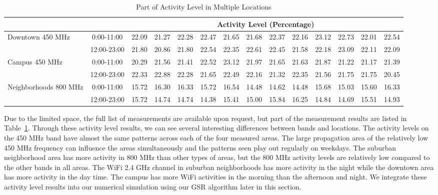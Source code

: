 \begin{table}
\begin{tabular}{|l|c|c|c|c|c|c|c|c|c|c|c|c|c|}
&& \multicolumn{12}{c|}{Activity Level (Percentage)}  \\
\hline
\multirow{2}{*}{Downtown 450 MHz}	
&0:00-11:00 &  22.09 &  21.27 &  22.28 &  22.47 &  21.65 &  21.68&  22.37 &  22.16&  23.12 &  22.73&  22.01 &  22.54 \\ 	
\cline{2-14}	
&12:00-23:00&  21.80 &  20.86 &  21.80 &  22.54 &  22.35 &  22.61&  22.45 &  21.58&  22.18 &  23.09&  22.11 &  22.09 \\ 	
\hline
\multirow{2}{*}{Campus 450 MHz}	
&0:00-11:00 &  20.29 &  21.56 &  21.41 &  22.52 &  23.12 &  21.97&  21.65 &  21.63&  21.87 &  21.22&  21.17 &  21.39 \\ 	
\cline{2-14}	
&12:00-23:00&  22.33 &  22.88 &  22.28 &  21.65 &  22.49 &  22.16&  21.32 &  22.35&  21.56 &  21.75&  21.75 &  20.45 \\ 	
\hline
\multirow{2}{*}{Neighborhoods 800 MHz}	
&0:00-11:00 &  15.72 &  16.30 &  16.33 &  15.72 &  16.54 &  14.48&  14.62 &  14.48&  15.68 &  15.03&  15.60 &  16.33 \\ 	
\cline{2-14}	
&12:00-23:00&  15.72 &  14.74 &  14.74 &  14.38 &  15.41 &  15.00&  15.84 &  16.25&  14.84 &  14.69&  15.51 &  14.93 \\ 	
\hline	
\end{tabular}    
\caption{Part of Activity Level in Multiple Locations} %
\label{tab:activitymeasurement}    
\vspace{-0.4in}
\end{table}    


Due to the limited space, the full list of measurements are available upon request, but part of the measurement results are listed in Table~\ref{tab:activitymeasurement}.
Through these activity level results, we can see several interesting differences between bands and locations.
The activity levels on the 450 MHz band have almost the same patterns across each of the four measured areas. 
The large propagation area of the relatively low 450 MHz frequency can influence the areas simultaneously and the patterns seen play out regularly on weekdays.
The suburban neighborhood area has more activity in 800 MHz than other types of areas, but the 800 MHz activity levels are relatively low compared to the other bands in all areas.
The WiFi 2.4 GHz channel in suburban neighborhoods has more activity in the night while the downtown area has more activity in the day time.
The campus has more WiFi activities in the morning than the afternoon and night. 
We integrate these activity level results into our numerical simulation using our GSR algorithm later in this section.



